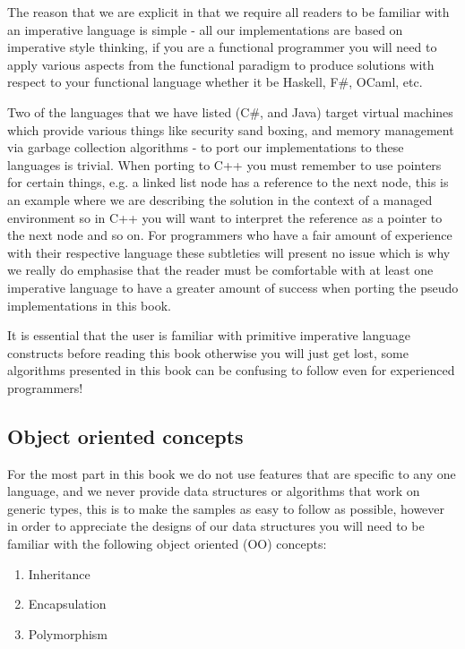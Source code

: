 The reason that we are explicit in that we require all readers to be familiar with an imperative language is simple - all our implementations are based on imperative style thinking, if you are a functional programmer you will need to apply various aspects from the functional paradigm to produce solutions with respect to your functional language whether it be Haskell, F\#, OCaml, etc.


Two of the languages that we have listed (C\#, and Java) target virtual machines which provide various things like security sand boxing, and memory management via garbage collection algorithms - to port our implementations to these languages is trivial. When porting to C++ you must remember to use pointers for certain things, e.g. a linked list node has a reference to the next node, this is an example where we are describing the solution in the context of a managed environment so in C++ you will want to interpret the reference as a pointer to the next node and so on. For programmers who have a fair amount of experience with their respective language these subtleties will present no issue which is why we really do emphasise that the reader must be comfortable with at least one imperative language to have a greater amount of success when porting the pseudo implementations in this book.


It is essential that the user is familiar with primitive imperative language constructs before reading this book otherwise you will just get lost, some algorithms presented in this book can be confusing to follow even for experienced programmers!

\subsection{Object oriented concepts}
For the most part in this book we do not use features that are specific to any one language, and we never provide data structures or algorithms that work on generic types, this is to make the samples as easy to follow as possible, however in order to appreciate the designs of our data structures you will need to be familiar with the following object oriented (OO) concepts:

\begin{enumerate}
\item Inheritance
\item Encapsulation
\item Polymorphism
\end{enumerate}

